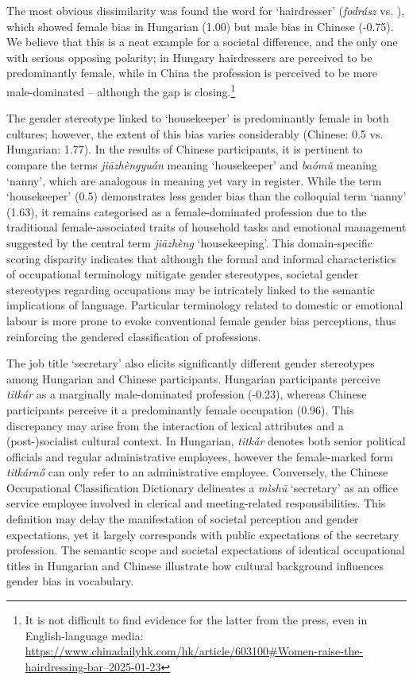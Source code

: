 \documentclass[10pt, a4paper]{article}
\newcommand{\zh}[1]{\simplifiedchinesefont{#1}\rmfamily}
\begin{document}
The most obvious dissimilarity was found the word for `hairdresser' (\textit{fodrász} vs. \zh{理发师}), which showed female bias in Hungarian (1.00) but male bias in Chinese (-0.75). We believe that this is a neat example for a societal difference, and the only one with serious opposing polarity; in Hungary hairdressers are perceived to be predominantly female, while in China the profession is perceived to be more male-dominated -- although the gap is closing.\footnote{It is not difficult to find evidence for the latter from the press, even in English-language media: \href{https://www.chinadailyhk.com/hk/article/603100\#Women-raise-the-hairdressing-bar--2025-01-23}{https://www.chinadailyhk.com/hk/article/603100\#Women-raise-the-hairdressing-bar--2025-01-23}}


The gender stereotype linked to `housekeeper' is predominantly female in both cultures; however, the extent of this bias varies considerably (Chinese: 0.5 vs. Hungarian: 1.77). In the results of Chinese participants, it is pertinent to compare the terms \zh{家政员} \textit{jiāzhèngyuán} meaning `housekeeper' and \zh{保姆} \textit{baómǔ} meaning `nanny', which are analogous in meaning yet vary in register. While the term `housekeeper' (0.5) demonstrates less gender bias than the colloquial term `nanny' (1.63), it remains categorised as a female-dominated profession due to the traditional female-associated traits of household tasks and emotional management suggested by the central term \zh{家政} \textit{jiāzhèng} `housekeeping'. This domain-specific scoring disparity indicates that although the formal and informal characteristics of occupational terminology mitigate gender stereotypes, societal gender stereotypes regarding occupations may be intricately linked to the semantic implications of language. Particular terminology related to domestic or emotional labour is more prone to evoke conventional female gender bias perceptions, thus reinforcing the gendered classification of professions.

The job title `secretary' also elicits significantly different gender stereotypes among Hungarian and Chinese participants. Hungarian participants perceive \textit{titkár} as a marginally male-dominated profession (-0.23), whereas Chinese participants perceive it a predominantly female occupation (0.96). This discrepancy may arise from the interaction of lexical attributes and a (post-)socialist cultural context. In Hungarian, \textit{titkár} denotes both senior political officials and regular administrative employees, however the female-marked form \textit{titkárnő} can only refer to an administrative employee. Conversely, the Chinese Occupational Classification Dictionary delineates a \zh{秘书} \textit{mìshū} `secretary' as an office service employee involved in clerical and meeting-related responsibilities. This definition may delay the manifestation of societal perception and gender expectations, yet it largely corresponds with public expectations of the secretary profession. The semantic scope and societal expectations of identical occupational titles in Hungarian and Chinese illustrate how cultural background influences gender bias in vocabulary.
\end{document}
